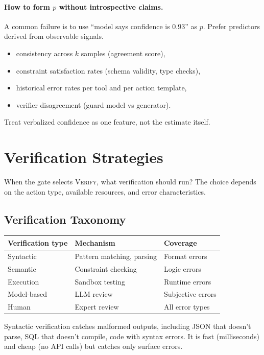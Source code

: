 \paragraph{How to form $p$ without introspective claims.}
A common failure is to use ``model says confidence is 0.93'' as $p$. Prefer predictors derived from observable signals.
\begin{itemize}
\item consistency across $k$ samples (agreement score),
\item constraint satisfaction rates (schema validity, type checks),
\item historical error rates per tool and per action template,
\item verifier disagreement (guard model vs generator).
\end{itemize}
Treat verbalized confidence as one feature, not the estimate itself.
\section{Verification Strategies}

When the gate selects \textsc{Verify}, what verification should run? The choice depends on the action type, available resources, and error characteristics.

\subsection{Verification Taxonomy}

\begin{center}
\begin{tabular}{lll}
\toprule
Verification type & Mechanism & Coverage \\
\midrule
Syntactic & Pattern matching, parsing & Format errors \\
Semantic & Constraint checking & Logic errors \\
Execution & Sandbox testing & Runtime errors \\
Model-based & LLM review & Subjective errors \\
Human & Expert review & All error types \\
\bottomrule
\end{tabular}
\end{center}

Syntactic verification catches malformed outputs, including JSON that doesn't parse, SQL that doesn't compile, code with syntax errors. It is fast (milliseconds) and cheap (no API calls) but catches only surface errors.

